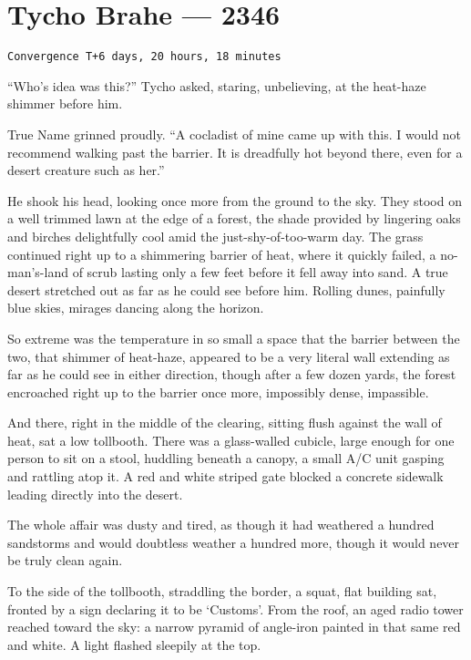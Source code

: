 \hypertarget{tycho-brahe-2346}{%
\chapter{Tycho Brahe — 2346}\label{tycho-brahe-2346}}

\begin{verbatim}
Convergence T+6 days, 20 hours, 18 minutes
\end{verbatim}

``Who's idea was this?'' Tycho asked, staring, unbelieving, at the heat-haze shimmer before him.

True Name grinned proudly. ``A cocladist of mine came up with this. I would not recommend walking past the barrier. It is dreadfully hot beyond there, even for a desert creature such as her.''

He shook his head, looking once more from the ground to the sky. They stood on a well trimmed lawn at the edge of a forest, the shade provided by lingering oaks and birches delightfully cool amid the just-shy-of-too-warm day. The grass continued right up to a shimmering barrier of heat, where it quickly failed, a no-man's-land of scrub lasting only a few feet before it fell away into sand. A true desert stretched out as far as he could see before him. Rolling dunes, painfully blue skies, mirages dancing along the horizon.

So extreme was the temperature in so small a space that the barrier between the two, that shimmer of heat-haze, appeared to be a very literal wall extending as far as he could see in either direction, though after a few dozen yards, the forest encroached right up to the barrier once more, impossibly dense, impassible.

And there, right in the middle of the clearing, sitting flush against the wall of heat, sat a low tollbooth. There was a glass-walled cubicle, large enough for one person to sit on a stool, huddling beneath a canopy, a small A/C unit gasping and rattling atop it. A red and white striped gate blocked a concrete sidewalk leading directly into the desert.

The whole affair was dusty and tired, as though it had weathered a hundred sandstorms and would doubtless weather a hundred more, though it would never be truly clean again.

To the side of the tollbooth, straddling the border, a squat, flat building sat, fronted by a sign declaring it to be `Customs'. From the roof, an aged radio tower reached toward the sky: a narrow pyramid of angle-iron painted in that same red and white. A light flashed sleepily at the top.

